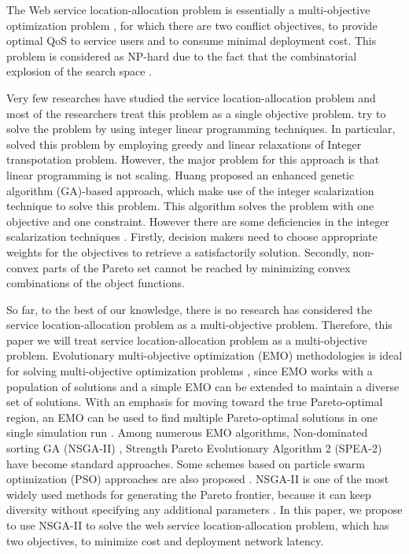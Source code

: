 \documentclass{llncs}
\begin{document}
The Web service location-allocation problem is essentially a multi-objective optimization problem \cite{Multiobjective}, for which there are two conflict objectives, to provide optimal 
QoS to service users and to consume minimal deployment cost.
This problem is considered as NP-hard due to the fact that the combinatorial explosion of the search space \cite{Vanrompay}. 


Very few researches have studied the service location-allocation problem and most of the researchers treat this problem as a single objective problem.
\cite{Aboolian} \cite{Sun} try to solve the problem by using integer linear programming techniques.
In particular, \cite{Sun} solved this problem by employing greedy and linear relaxations of Integer 
transpotation problem.
However, the major problem for this approach is that linear programming is not scaling.
Huang \cite{EnhancedGenetic} proposed an enhanced genetic algorithm (GA)-based approach, which make use of the integer scalarization technique to solve this problem.
This algorithm solves the problem with one objective and one constraint. However there are some deficiencies in the
integer scalarization techniques \cite{Multiobjective}. Firstly, decision makers need to choose appropriate weights for the objectives to retrieve a satisfactorily solution. 
Secondly, non-convex parts of the Pareto set cannot be reached by minimizing convex combinations of the object functions.


So far, to the best of our knowledge, there is no research has considered the service location-allocation problem as a multi-objective problem. Therefore, this paper we will treat service location-allocation problem as a multi-objective problem. Evolutionary multi-objective optimization (EMO) methodologies
 is ideal for solving multi-objective optimization problems \cite{key:article}, since EMO works with a population of solutions and 
a simple EMO can be extended to maintain a diverse set of solutions.
With an emphasis for moving toward the true Pareto-optimal region, an EMO can be used to find multiple Pareto-optimal solutions in 
one single simulation run \cite{OptimizationElectrical}. Among numerous EMO algorithms,
Non-dominated sorting GA (NSGA-II) \cite{996017}, Strength Pareto Evolutionary Algorithm 2 (SPEA-2) \cite{Deb} have become standard approaches. 
Some schemes based on particle swarm optimization (PSO) approaches are also proposed \cite{Elhossini} \cite{Huang}.
NSGA-II is one of the most widely used methods for generating the Pareto frontier, because it can keep diversity without specifying any additional parameters \cite{Deb06referencepoint}.
In this paper, we propose to use NSGA-II to solve the web service location-allocation problem, which has two objectives, to minimize
cost and deployment network latency.
\end{document}
